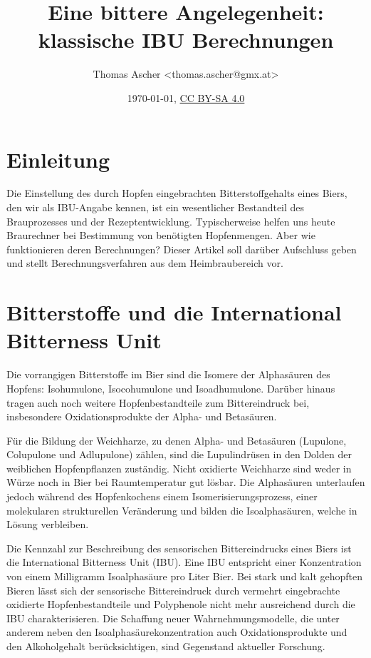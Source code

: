 \documentclass[a4paper,parskip=half]{scrartcl}
\title{Eine bittere Angelegenheit: klassische IBU Berechnungen}
\author{Thomas Ascher <thomas.ascher@gmx.at>}
\date{\today, \href{http://creativecommons.org/licenses/by-sa/4.0/}{CC BY-SA 4.0}}
\begin{document}
\maketitle

\section*{Einleitung}

Die Einstellung des durch Hopfen eingebrachten Bitterstoffgehalts eines Biers, den wir als IBU-Angabe kennen, ist ein wesentlicher Bestandteil des Brauprozesses und der Rezeptentwicklung. Typischerweise helfen uns heute Braurechner bei Bestimmung von benötigten Hopfenmengen. Aber wie funktionieren deren Berechnungen? Dieser Artikel soll darüber Aufschluss geben und stellt Berechnungsverfahren aus dem Heimbraubereich vor.

\section*{Bitterstoffe und die International Bitterness Unit}

Die vorrangigen Bitterstoffe im Bier sind die Isomere der Alphasäuren des Hopfens: Isohumulone, Isocohumulone und Isoadhumulone. Darüber hinaus tragen auch noch weitere Hopfenbestandteile zum Bittereindruck bei, insbesondere Oxidationsprodukte der Alpha- und Betasäuren. \parencite{MEBAK2020}

Für die Bildung der Weichharze, zu denen Alpha- und Betasäuren (Lupulone, Colupulone und Adlupulone) zählen, sind die Lupulindrüsen in den Dolden der weiblichen Hopfenpflanzen zuständig. Nicht oxidierte Weichharze sind weder in Würze noch in Bier bei Raumtemperatur gut lösbar. Die Alphasäuren unterlaufen jedoch während des Hopfenkochens einem Isomerisierungsprozess, einer molekularen strukturellen Veränderung und bilden die Isoalphasäuren, welche in Lösung verbleiben. \parencites{Hall1997}[20-23]{Nottebohm2020}

Die Kennzahl zur Beschreibung des sensorischen Bittereindrucks eines Biers ist die International Bitterness Unit (IBU). Eine IBU entspricht einer Konzentration von einem Milligramm Isoalphasäure pro Liter Bier. Bei stark und kalt gehopften Bieren lässt sich der sensorische Bittereindruck durch vermehrt eingebrachte oxidierte Hopfenbestandteile und Polyphenole nicht mehr ausreichend durch die IBU charakterisieren. Die Schaffung neuer Wahrnehmungsmodelle, die unter anderem neben den Isoalphasäurekonzentration auch Oxidationsprodukte und den Alkoholgehalt berücksichtigen, sind Gegenstand aktueller Forschung. \parencite{Kishimoto2021}
\end{document}
